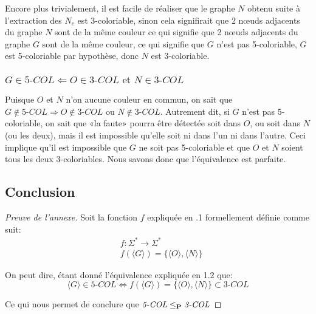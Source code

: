 \documentclass{article}
\newcommand\PP{{\normalfont{\textbf{P}}}}
\newcommand\col[1]{\textit{#1-COL}}
\newcommand\bk[1]{\langle #1 \rangle}
\begin{document}
Encore plus trivialement, il est facile de réaliser que le graphe $N$ obtenu suite à l'extraction des $N_c$ est 3-coloriable, sinon cela signifirait que 2 n\oe{}uds adjacents du graphe $N$ sont de la même couleur ce qui signifie que 2 n\oe{}uds adjacents du graphe $G$ sont de la même couleur, ce qui signifie que $G$ n'est pas 5-coloriable, $G$ est 5-coloriable par hypothèse, donc $N$ est 3-coloriable.

\subsubsection{\normalfont $G \in \col{5} \Leftarrow O \in \col{3} \text{  et  } N \in \col{3}$}
Puisque $O$ et $N$ n'on aucune couleur en commun, on sait que $G \notin \col{5} \Rightarrow O \notin \col{3} \text{  ou  } N \notin \col{3}$. Autrement dit, si $G$ n'est pas 5-coloriable, on sait que «la faute» pourra être détectée soit dans $O$, ou soit dans $N$ (ou les deux), mais il est impossible qu'elle soit ni dans l'un ni dans l'autre. Ceci implique qu'il est impossible que $G$ ne soit pas 5-coloriable et que $O$ et $N$ soient tous les deux 3-coloriables. Nous savons donc que l'équivalence est parfaite.

\subsection{Conclusion}
\begin{proof}[Preuve de l'annexe]
  Soit la fonction $f$ expliquée en .1 formellement définie comme suit:
  \begin{align*}
    &f: \Sigma^* \rightarrow \Sigma^* \\
    &f(\bk{G}) = \{\bk{O}, \bk{N}\}
  \end{align*}

  On peut dire, étant donné l'équivalence expliquée en 1.2 que:
  $$\bk{G} \in \col{5} \Leftrightarrow f(\bk{G}) = \{\bk{O}, \bk{N}\} \subset \col{3}$$

  Ce qui nous permet de conclure que $\col{5} \leq_\PP \col{3}$
\end{proof}
\end{document}

